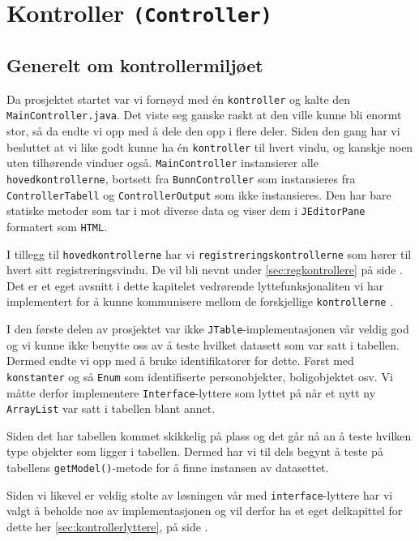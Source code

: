 \section{Kontroller \texttt{(Controller)}} \label{sec:kontroller}

\subsection{Generelt om kontrollermiljøet}
Da prosjektet startet var vi fornøyd med én \texttt{kontroller} og kalte den \texttt{MainController.java}. Det viste seg ganske raskt at den ville kunne bli enormt stor, så da endte vi opp med å dele den opp i flere deler. Siden den gang har vi besluttet at vi like godt kunne ha én \texttt{kontroller} til hvert vindu, og kanskje noen uten tilhørende vinduer også.
\texttt{MainController} instansierer alle \texttt{hovedkontrollerne}, bortsett fra \texttt{BunnController} som instansieres fra \texttt{ControllerTabell} og \texttt{ControllerOutput} som ikke instansieres. Den har bare statiske metoder som tar i mot diverse data og viser dem i \texttt{JEditorPane} formatert som \texttt{HTML}.

I tillegg til \texttt{hovedkontrollerne} har vi \texttt{registreringskontrollerne} som hører til hvert sitt registreringsvindu. De vil bli nevnt under \ref{sec:regkontrollere} på side \pageref{sec:regkontrollere}. \\

Det er et eget avsnitt i dette kapitelet vedrørende lyttefunksjonaliten vi har implementert for å kunne kommunisere mellom de forskjellige \texttt{kontrollerne} .

I den første delen av prosjektet var ikke \texttt{JTable}-implementasjonen vår veldig god og vi kunne ikke benytte oss av å teste hvilket datasett som var satt i tabellen. Dermed endte vi opp med å bruke identifikatorer for dette. Først med \texttt{konstanter} og så \texttt{Enum} som identifiserte personobjekter, boligobjektet osv.
Vi måtte derfor implementere \texttt{Interface}-lyttere som lyttet på når et nytt ny \texttt{ArrayList} var satt i tabellen blant annet.

Siden det har tabellen kommet skikkelig på plass og det går nå an å teste hvilken type objekter som ligger i tabellen. Dermed har vi til dels begynt å teste på tabellens \texttt{getModel()}-metode for å finne instansen av datasettet.

Siden vi likevel er veldig  stolte av løsningen vår med \texttt{interface}-lyttere har vi valgt å beholde noe av implementasjonen og vil derfor ha et eget delkapittel for dette her \ref{sec:kontrollerlyttere}, på side \pageref{sec:kontrollerlyttere}.


